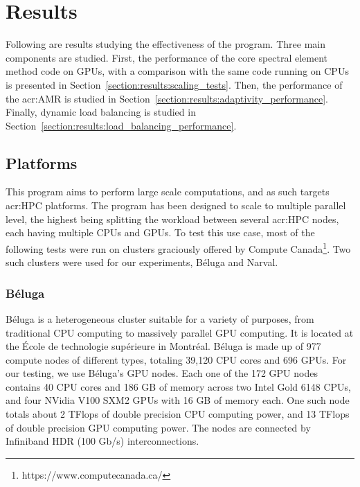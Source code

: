 \chapter{Results} \label{chapter:results}

Following are results studying the effectiveness of the program. Three main components are studied.
First, the performance of the core spectral element method code on GPUs, with a comparison with the
same code running on CPUs is presented in Section~\ref{section:results:scaling_tests}. Then, the
performance of the \acrlong{acr:AMR} is studied in
Section~\ref{section:results:adaptivity_performance}. Finally, dynamic load balancing is studied in
Section~\ref{section:results:load_balancing_performance}.

\section{Platforms} \label{section:results:platforms}

This program aims to perform large scale computations, and as such targets \acrshort{acr:HPC}
platforms. The program has been designed to scale to multiple parallel level, the highest being
splitting the workload between several \acrshort{acr:HPC} nodes, each having multiple CPUs and GPUs.
To test this use case, most of the following tests were run on clusters graciously offered by
Compute Canada\footnote{https://www.computecanada.ca/}. Two such clusters were used for our
experiments, Béluga and Narval.

\subsection{Béluga} \label{subsection:results:platforms:beluga}

Béluga is a heterogeneous cluster suitable for a variety of purposes, from traditional CPU computing
to massively parallel GPU computing. It is located at the École de technologie supérieure in
Montréal. Béluga is made up of 977 compute nodes of different types, totaling 39,120 CPU cores and
696 GPUs. For our testing, we use Béluga's GPU nodes. Each one of the 172 GPU nodes contains 40 CPU
cores and 186 GB of memory across two Intel Gold 6148 CPUs, and four NVidia V100 SXM2 GPUs with 16
GB of memory each. One such node totals about 2 TFlops of double precision CPU computing power, and
13 TFlops of double precision GPU computing power. The nodes are connected by Infiniband HDR (100
Gb/s) interconnections.

